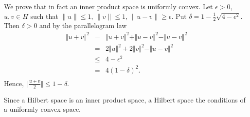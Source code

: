 \documentclass[12pt]{article}
\begin{document}
We prove that in fact an inner product space is uniformly convex.
Let $\epsilon >0$, $u,v \in H$ such that $\|u\|\leq 1$, $\|v\|\leq 1$, $\|u-v\|\geq \epsilon$. Put $\delta = 1-\frac{1}{2}\sqrt{4-\epsilon^2}$.
Then $\delta >0$ and by the parallelogram law
\begin{eqnarray*}
\Vert u+v\Vert^2 & = & \Vert u + v \Vert^2 + \Vert u-v\Vert^2 - \Vert u-v\Vert^2\\
&=& 2 \Vert u \Vert^2 + 2\Vert v \Vert^2 - \Vert u-v\Vert^2 \\
& \leq &  4  - \epsilon^2 \\
& = & 4(1-\delta)^2.\\
\end{eqnarray*}
Hence,  $\Vert\frac{u+v}{2}\Vert\leq 1-\delta$. 

Since a Hilbert space is an inner product space, 
 a Hilbert space  the conditions of a uniformly convex space.
\end{document}
